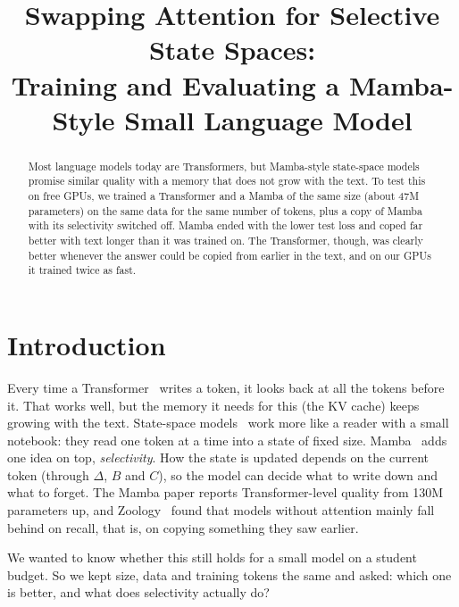\documentclass[conference]{IEEEtran}
\begin{document}
\title{Swapping Attention for Selective State Spaces:\\
Training and Evaluating a Mamba-Style Small Language Model}

\author{
}

\maketitle

\begin{abstract}
Most language models today are Transformers, but Mamba-style state-space models promise similar quality
with a memory that does not grow with the text. To test this on free GPUs, we trained a Transformer and a
Mamba of the same size (about 47M parameters) on the same data for the same number of tokens, plus a copy
of Mamba with its selectivity switched off. Mamba ended with the
lower test loss and coped far better with text longer than it was trained on. The Transformer, though, was
clearly better whenever the answer could be copied from earlier in the text, and on our GPUs it trained
twice as fast.
\end{abstract}

\section{Introduction}
Every time a Transformer~\cite{vaswani2017attention} writes a token, it looks back at all the tokens before
it. That works well, but the memory it needs for this (the KV cache) keeps growing with the text.
State-space models~\cite{gu2022s4} work more like a reader with a small notebook: they read one token at a
time into a state of fixed size. Mamba~\cite{gu2023mamba} adds one idea on top, \emph{selectivity}. How the
state is updated depends on the current token (through $\Delta$, $B$ and $C$), so the model can decide what
to write down and what to forget. The Mamba paper reports Transformer-level quality from 130M parameters
up, and Zoology~\cite{arora2023zoology} found that models without attention mainly fall behind on recall,
that is, on copying something they saw earlier.

We wanted to know whether this still holds for a small model on a student budget. So we kept size, data
and training tokens the same and asked: which one is better, and what does selectivity actually do?
\end{document}
